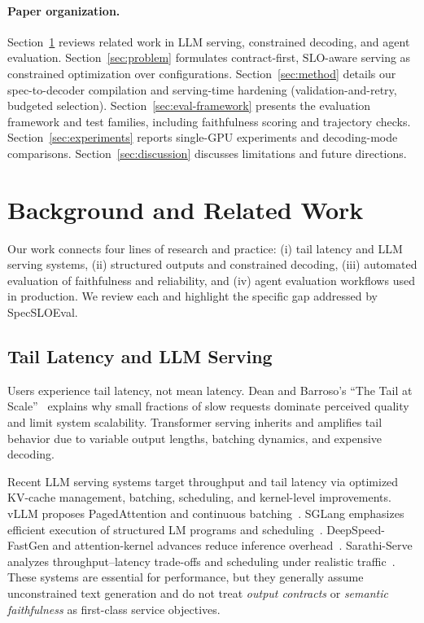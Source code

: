 \documentclass[11pt]{article}
\newcommand{\slo}{\ensuremath{\mathrm{SLO}}}
\begin{document}
\paragraph{Paper organization.}
Section~\ref{sec:background} reviews related work in LLM serving, constrained decoding, and agent evaluation.
Section~\ref{sec:problem} formulates contract-first, \slo-aware serving as constrained optimization over configurations.
Section~\ref{sec:method} details our spec-to-decoder compilation and serving-time hardening (validation-and-retry, budgeted selection).
Section~\ref{sec:eval-framework} presents the evaluation framework and test families, including faithfulness scoring and trajectory checks.
Section~\ref{sec:experiments} reports single-GPU experiments and decoding-mode comparisons.
Section~\ref{sec:discussion} discusses limitations and future directions.

\section{Background and Related Work}
\label{sec:background}

Our work connects four lines of research and practice: (i) tail latency and LLM serving systems, (ii) structured outputs and constrained decoding, (iii) automated evaluation of faithfulness and reliability, and (iv) agent evaluation workflows used in production.
We review each and highlight the specific gap addressed by SpecSLOEval.

\subsection{Tail Latency and LLM Serving}

Users experience tail latency, not mean latency.
Dean and Barroso’s “The Tail at Scale”~\citep{dean2013tail} explains why small fractions of slow requests dominate perceived quality and limit system scalability.
Transformer serving inherits and amplifies tail behavior due to variable output lengths, batching dynamics, and expensive decoding.

Recent LLM serving systems target throughput and tail latency via optimized KV-cache management, batching, scheduling, and kernel-level improvements.
vLLM proposes PagedAttention and continuous batching~\citep{kwon2023vllm}.
SGLang emphasizes efficient execution of structured LM programs and scheduling~\citep{zheng2023sglang}.
DeepSpeed-FastGen and attention-kernel advances reduce inference overhead~\citep{dao2023flashattention2,prabhu2024vattention}.
Sarathi-Serve analyzes throughput--latency trade-offs and scheduling under realistic traffic~\citep{agrawal2024sarathi}.
These systems are essential for performance, but they generally assume unconstrained text generation and do not treat \emph{output contracts} or \emph{semantic faithfulness} as first-class service objectives.
\end{document}
